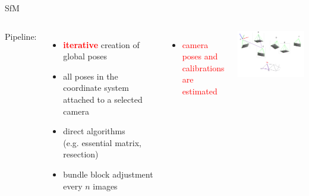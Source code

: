 \documentclass{beamer}
\begin{document}
		\begin{frame}{SfM}
			\begin{columns}
			\setlength{\unitlength}{1cm}
			\hspace{1cm}
%
		Pipeline:
		\begin{itemize} 
			\item \footnotesize \textcolor{red}{\textbf{iterative}} creation of global poses
			\item \footnotesize all poses in the coordinate system attached to a selected camera
			\item \footnotesize direct algorithms \\(e.g. essential matrix, resection) 
			\item \footnotesize bundle block adjustment \\ every $n$ images
		\end{itemize}
%  
%  
		\vspace{0.5cm}
    	\footnotesize 
		\begin{itemize}
			\item<2-> \textcolor{red}{camera poses and calibrations \\are estimated}
		\end{itemize}

		\setlength{\unitlength}{1cm}
		\includegraphics[width=7.5cm]{images/sfm1.pdf} 

		\end{columns}
		\end{frame}			
\end{document}
